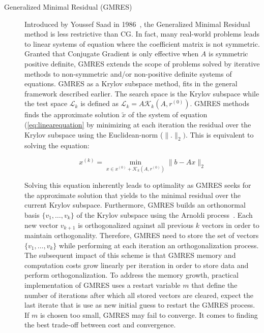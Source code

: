 \begin{description}
\item[Generalized Minimal Residual (GMRES)] Introduced by Youssef Saad in 1986~\cite{saad_gmres_1986}, the Generalized Minimal Residual method is less restrictive than CG. In fact, many real-world problems leads to linear systems of equation where the coefficient matrix is not symmetric. Granted that Conjugate Gradient is only effective when $A$ is symmetric positive definite, GMRES extends the scope of problems solved by iterative methods to non-symmetric and/or non-positive definite systems of equations. GMRES as a Krylov subspace method, fits in the general framework described earlier. The search space is the Krylov subspace while the test space $\mathcal{L}_k$ is defined as $\mathcal{L}_k = A\mathcal{K}_k(A, r^{(0)})$. GMRES methods finds the approximate solution $\tilde{x}$ of the system of equation (\ref{eq:linearequation} by minimizing at each iteration the residual over the Krylov subspace using the Euclidean-norm ($\|.\|_{2})$. This is equivalent to solving the equation:

\begin{equation}
    x^{(k)} = \min_{x \in x^{(0)} + \mathcal{K}_k(A, r^{(0)})} \| b - Ax \|_2
    \label{eq:gmres}
\end{equation}

Solving this equation inherently leads to optimality as GMRES seeks for the approximate solution that yields to the minimal residual over the current Krylov subspace. Furthermore, GMRES builds an orthonormal basis $\{v_1, \dots, v_k\}$ of the Krylov subspace using the Arnoldi process~\cite{arnoldi_principle_1951}. Each new vector $v_{k+1}$ is orthogonalized against all previous $k$ vectors in order to maintain orthogonality. Therefore, GMRES need to store the set of vectors $\{v_1, \dots, v_k\}$ while performing at each iteration an orthogonalization process. The subsequent impact of this scheme is that GMRES memory and computation costs grow linearly per iteration in order to store data and perform orthogonalization. To address the memory growth, practical implementation of GMRES uses a restart variable $m$ that define the number of iterations after which all stored vectors are cleared, expect the last iterate that is use as new initial guess to restart the GMRES process. If $m$ is chosen too small, GMRES may fail to converge. It comes to finding the best trade-off between cost and convergence.

\end{description}




